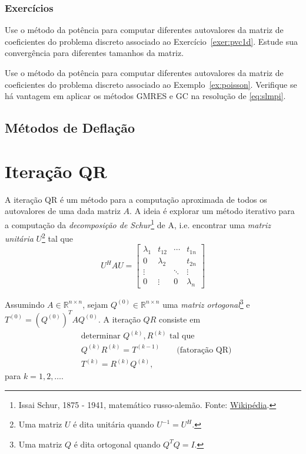 \subsubsection{Exercícios}

\begin{exer}
  Use o método da potência para computar diferentes autovalores da matriz de coeficientes do problema discreto associado ao Exercício~\ref{exer:pvc1d}. Estude sua convergência para diferentes tamanhos da matriz. 
\end{exer}

\begin{exer}
  Use o método da potência para computar diferentes autovalores da matriz de coeficientes do problema discreto associado ao Exemplo~\ref{ex:poisson}. Verifique se há vantagem em aplicar os métodos GMRES e GC na resolução de \eqref{eq:slmpi}.
\end{exer}

\subsection{Métodos de Deflação}
\badgeConstrucao

\section{Iteração QR}\label{cap_autoval_sec_qr}
\badgeRevisar

A iteração QR é um método para a computação aproximada de todos os autovalores de uma dada matriz $A$. A ideia é explorar um método iterativo para a computação da \emph{decomposição de Schur}\footnote{Issai Schur, 1875 - 1941, matemático russo-alemão. Fonte: \href{https://pt.wikipedia.org/wiki/Issai_Schur}{Wikipédia}.} de A, i.e. encontrar uma \emph{matriz unitária} $U$\footnote{Uma matriz $U$ é dita unitária quando $U^{-1} = U^H$.} tal que
\begin{equation}
  U^{H}AU =
  \begin{bmatrix}
    \lambda_1 & t_{12} & \cdots & t_{1n}\\
    0 & \lambda_2 & & t_{2n}\\
    \vdots & & \ddots & \vdots\\
    0 & \vdots & 0 & \lambda_n
  \end{bmatrix}
\end{equation}

Assumindo $A\in\mathbb{R}^{n\times n}$, sejam $Q^{(0)}\in\mathbb{R}^{n\times n}$ uma \emph{matriz ortogonal}\footnote{Uma matriz $Q$ é dita ortogonal quando $Q^TQ = I$.} e $T^{(0)} = (Q^{(0)})^TAQ^{(0)}$. A iteração $QR$ consiste em
\begin{align}
  &\text{determinar }Q^{(k)}, R^{(k)}\text{ tal que}\nonumber\\
  &Q^{(k)}R^{(k)} = T^{(k-1)}\qquad\text{(fatoração QR)}\\
  &T^{(k)} = R^{(k)}Q^{(k)},
\end{align}
para $k=1,2,\ldots$.

